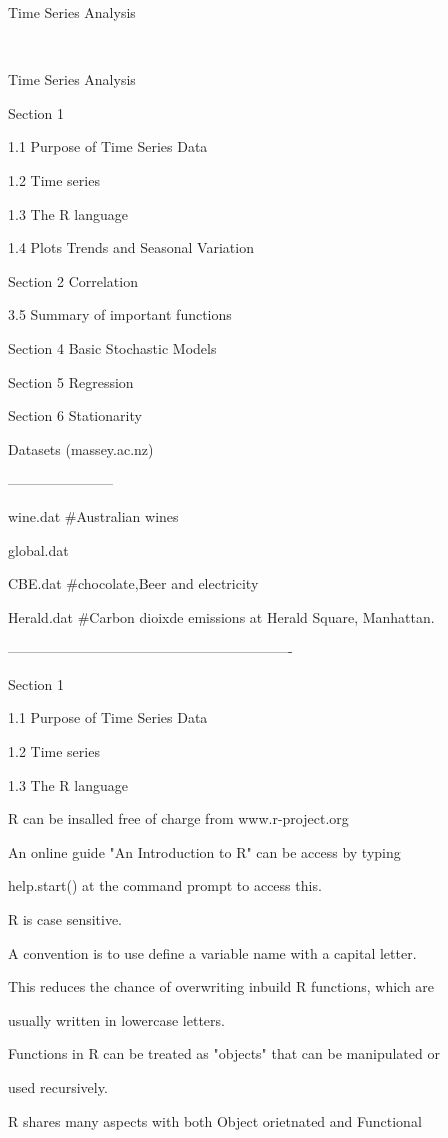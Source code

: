 
Time Series Analysis 



Time Series Analysis

Section 1

1.1 Purpose of Time Series Data

1.2 Time series

1.3 The R language

1.4 Plots Trends and Seasonal Variation

Section 2 Correlation

3.5 Summary of important functions

Section 4 Basic Stochastic Models

Section 5 Regression

Section 6 Stationarity



Datasets (massey.ac.nz)

-----------------------



wine.dat        #Australian wines

global.dat

CBE.dat         #chocolate,Beer and electricity

Herald.dat      #Carbon dioixde emissions at Herald Square, Manhattan.

-------------------------------------------------------------


Section 1


1.1 Purpose of Time Series Data


1.2 Time series


1.3 The R language


R can be insalled free of charge from www.r-project.org


An online guide "An Introduction to R" can  be access by typing

help.start() at the command prompt to access this.


R is case sensitive.

A convention is to use define a variable name with a capital letter.

This reduces the chance of overwriting inbuild R functions, which are

usually written in lowercase letters.



Functions in R can be treated as "objects" that can be manipulated or

used recursively.


R shares many aspects with both Object orietnated and Functional

